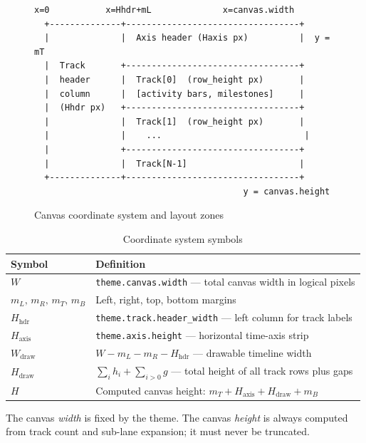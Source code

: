 \begin{figure}[h]
\centering
\begin{Verbatim}[frame=single,fontsize=\small]
  x=0           x=Hhdr+mL              x=canvas.width
  +--------------+----------------------------------+
  |              |  Axis header (Haxis px)          |  y = mT
  |  Track       +----------------------------------+
  |  header      |  Track[0]  (row_height px)       |
  |  column      |  [activity bars, milestones]     |
  |  (Hhdr px)   +----------------------------------+
  |              |  Track[1]  (row_height px)       |
  |              |    ...                            |
  |              +----------------------------------+
  |              |  Track[N-1]                      |
  +--------------+----------------------------------+
                                         y = canvas.height
\end{Verbatim}
\caption{Canvas coordinate system and layout zones}
\label{fig:canvas-layout}
\end{figure}

\begin{table}[h]
\centering
\small
\begin{tabular}{lp{9.5cm}}
\toprule
\textbf{Symbol} & \textbf{Definition} \\
\midrule
$W$ & \texttt{theme.canvas.width} --- total canvas width in logical pixels \\
$m_L,\,m_R,\,m_T,\,m_B$ & Left, right, top, bottom margins \\
$H_{\mathrm{hdr}}$ & \texttt{theme.track.header\_width} --- left column for track labels \\
$H_{\mathrm{axis}}$ & \texttt{theme.axis.height} --- horizontal time-axis strip \\
$W_{\mathrm{draw}}$ & $W - m_L - m_R - H_{\mathrm{hdr}}$ --- drawable timeline width \\
$H_{\mathrm{draw}}$ & $\displaystyle\sum_{i} h_i + \sum_{i>0} g$ --- total height of all track rows plus gaps \\
$H$ & Computed canvas height: $m_T + H_{\mathrm{axis}} + H_{\mathrm{draw}} + m_B$ \\
\bottomrule
\end{tabular}
\caption{Coordinate system symbols}
\label{tab:coord-symbols}
\end{table}

The canvas \emph{width} is fixed by the theme. The canvas \emph{height} is always computed
from track count and sub-lane expansion; it must never be truncated.


